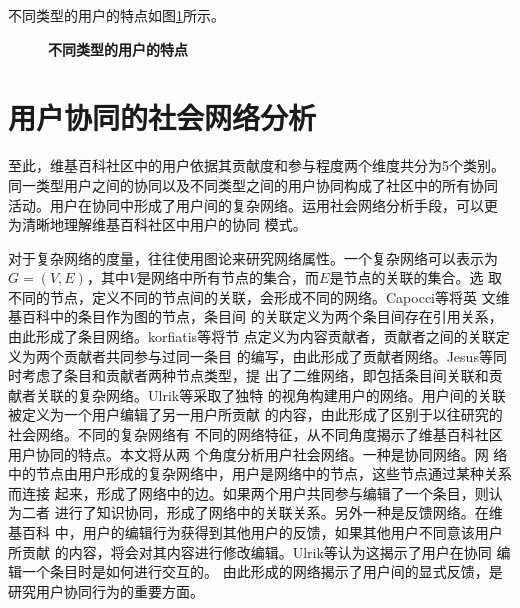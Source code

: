 不同类型的用户的特点如图\ref{fig:user-cat}所示。
\begin{figure}[htb]
  \centering
  \caption{\small{\textbf{不同类型的用户的特点}}}
  \label{fig:user-cat}
\end{figure}
\section{用户协同的社会网络分析}
\label{sec:social-analysis}


至此，维基百科社区中的用户依据其贡献度和参与程度两个维度共分为5个类别。
同一类型用户之间的协同以及不同类型之间的用户协同构成了社区中的所有协同
活动。用户在协同中形成了用户间的复杂网络。运用社会网络分析手段，可以更
为清晰地理解维基百科社区中用户的协同
模式。

对于复杂网络的度量，往往使用图论来研究网络属性。一个复杂网络可以表示为
$G=(V,E)$，其中$V$是网络中所有节点的集合，而$E$是节点的关联的集合。选
取不同的节点，定义不同的节点间的关联，会形成不同的网络。Capocci等将英
文维基百科中的条目作为图的节点，条目间
的关联定义为两个条目间存在引用关系，由此形成了条目网络\cite{PhysRevE.74.036116}。korfiatis等将节
点定义为内容贡献者，贡献者之间的关联定义为两个贡献者共同参与过同一条目
的编写，由此形成了贡献者网络\cite{korfiatis2006evaluating}。Jesus等同时考虑了条目和贡献者两种节点类型，提
出了二维网络，即包括条目间关联和贡献者关联的复杂网络\cite{jesus2009bipartite}。Ulrik等采取了独特
的视角构建用户的网络。用户间的关联被定义为一个用户编辑了另一用户所贡献
的内容，由此形成了区别于以往研究的社会网络\cite{1526808}。不同的复杂网络有
不同的网络特征，从不同角度揭示了维基百科社区用户协同的特点。本文将从两
个角度分析用户社会网络。一种是协同网络。网
络中的节点由用户形成的复杂网络中，用户是网络中的节点，这些节点通过某种关系而连接
起来，形成了网络中的边。如果两个用户共同参与编辑了一个条目，则认为二者
进行了知识协同，形成了网络中的关联关系。另外一种是反馈网络。在维基百科
中，用户的编辑行为获得到其他用户的反馈，如果其他用户不同意该用户所贡献
的内容，将会对其内容进行修改编辑。Ulrik等认为这揭示了用户在协同
编辑一个条目时是如何进行交互的\cite{1526808}。
由此形成的网络揭示了用户间的显式反馈，是研究用户协同行为的重要方面。

